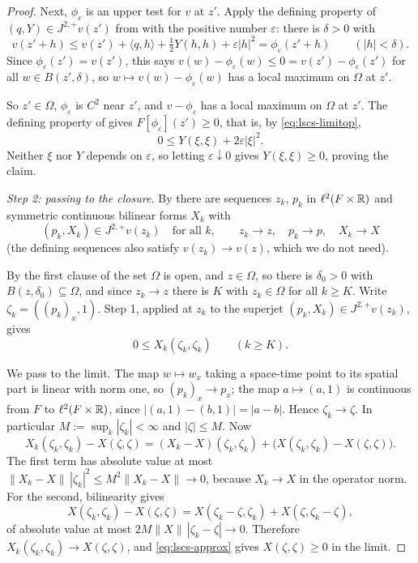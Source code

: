 \begin{proof}
Next, $\phi_\varepsilon$ is an upper test for $v$ at $z'$. Apply the defining
property of $(q,Y)\in J^{2,+}v(z')$ from  with the positive
number $\varepsilon$: there is $\delta>0$ with
\[
  v(z'+h)\le v(z')+\langle q,h\rangle+\tfrac12Y(h,h)+\varepsilon|h|^2
    =\phi_\varepsilon(z'+h)
  \qquad(|h|<\delta).
\]
Since $\phi_\varepsilon(z')=v(z')$, this says
$v(w)-\phi_\varepsilon(w)\le0=v(z')-\phi_\varepsilon(z')$ for all $w\in
B(z',\delta)$, so $w\mapsto v(w)-\phi_\varepsilon(w)$ has a local maximum on
$\Omega$ at $z'$.

So $z'\in\Omega$, $\phi_\varepsilon$ is $C^2$ near $z'$, and
$v-\phi_\varepsilon$ has a local maximum on $\Omega$ at $z'$. The defining
property of  gives $F[\phi_\varepsilon](z')\ge0$, that is,
by \eqref{eq:lscs-limitop},
\[
  0\le Y(\xi,\xi)+2\varepsilon|\xi|^2 .
\]
Neither $\xi$ nor $Y$ depends on $\varepsilon$, so letting
$\varepsilon\downarrow0$ gives $Y(\xi,\xi)\ge0$, proving the claim.

\emph{Step 2: passing to the closure.}
By  there are sequences $z_k$, $p_k$ in
$\ell^2(F\times\mathbb{R})$ and symmetric continuous bilinear forms $X_k$ with
\[
  (p_k,X_k)\in J^{2,+}v(z_k)\quad\text{for all }k,
  \qquad z_k\to z,\quad p_k\to p,\quad X_k\to X
\]
(the defining sequences also satisfy $v(z_k)\to v(z)$, which we do not need).

By the first clause of  the set $\Omega$ is open, and
$z\in\Omega$, so there is $\delta_0>0$ with $B(z,\delta_0)\subseteq\Omega$, and
since $z_k\to z$ there is $K$ with $z_k\in\Omega$ for all $k\ge K$. Write
$\zeta_k=((p_k)_x,1)$. Step 1, applied at $z_k$ to the superjet
$(p_k,X_k)\in J^{2,+}v(z_k)$, gives
\begin{equation}\label{eq:lscs-approx}
  0\le X_k(\zeta_k,\zeta_k)\qquad(k\ge K).
\end{equation}

We pass to the limit. The map $w\mapsto w_x$ taking a space-time point to its
spatial part is linear with norm one, so $(p_k)_x\to p_x$; the map
$a\mapsto(a,1)$ is continuous from $F$ to $\ell^2(F\times\mathbb{R})$, since
$|(a,1)-(b,1)|=|a-b|$. Hence $\zeta_k\to\zeta$. In particular
$M:=\sup_k|\zeta_k|<\infty$ and $|\zeta|\le M$. Now
\[
  X_k(\zeta_k,\zeta_k)-X(\zeta,\zeta)
   =(X_k-X)(\zeta_k,\zeta_k)+\bigl(X(\zeta_k,\zeta_k)-X(\zeta,\zeta)\bigr).
\]
The first term has absolute value at most
$\|X_k-X\|\,|\zeta_k|^2\le M^2\|X_k-X\|\to0$, because $X_k\to X$ in the operator
norm. For the second, bilinearity gives
\[
  X(\zeta_k,\zeta_k)-X(\zeta,\zeta)
    =X(\zeta_k-\zeta,\zeta_k)+X(\zeta,\zeta_k-\zeta),
\]
of absolute value at most $2M\|X\|\,|\zeta_k-\zeta|\to0$. Therefore
$X_k(\zeta_k,\zeta_k)\to X(\zeta,\zeta)$, and \eqref{eq:lscs-approx} gives
$X(\zeta,\zeta)\ge0$ in the limit.
\end{proof}
